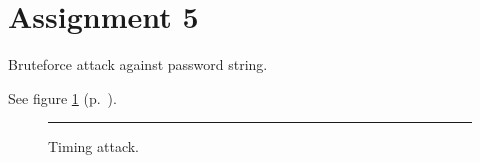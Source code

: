 \section*{Assignment 5}

Bruteforce attack against password string.

See figure \ref{as5-schematic} (p.~\pageref{as5-schematic}).

\begin{figure}[tb]
    \begin{center}
        
        \caption{Timing attack.}
        \label{as5-schematic}
        \vspace{1em}\hrule
    \end{center}
\end{figure}
